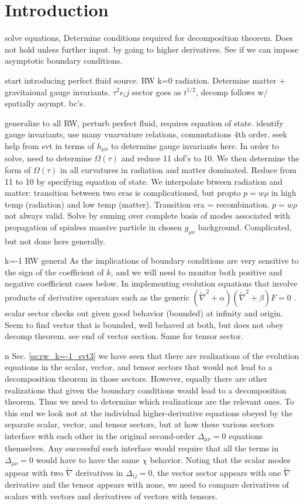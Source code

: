 
\chapter{Introduction}
\label{c:introduction}

solve equations, Determine conditions required for decomposition theorem. Does not hold unless further input. by going to higher derivatives. See if we can impose asymptotic boundary conditions. 

start introducing perfect fluid source. RW k=0 radiation. Determine matter + gravitaional gauge invariants. $\tau^2 e_ij$ sector goes as $t^{1/2}$, decomp follows w/ spatially asympt. bc's.

generalize to all RW, perturb perfect fluid, requires equation of state. identify gauge invariants, use many vuarvature relations, commutations 4th order. seek help from svt in terms of $h_{\mu\nu}$ to determine gauge invariants here. In order to solve, need to determine $\Omega(\tau)$ and reduce 11 dof's to 10. We then determine the form of $\Omega(\tau)$ in all curvatures in radiation and matter dominated. Reduce from 11 to 10 by specifying equation of state. We interpolate btween radiation and matter: transition between two eras is complicationed, but propto $p=w\rho$ in high temp (radiation) and low temp (matter). Transition era = recombination. $p=w\rho$ not always valid. Solve by suming over complete basis of modes associated with propagation of spinless massive particle in chosen $g_{\mu\nu}$ background. Complicated, but not done here generally. 

k=-1 RW general As the implications of boundary conditions are very sensitive to the sign of the coefficient of $k$, and we will need to monitor both positive and negative coefficient cases below. In implementing evolution equations that involve products of derivative operators such as the generic $(\tilde{\nabla}^2+\alpha)(\tilde{\nabla}^2+\beta)F=0$ . scalar sector checks out given good behavior (bounded) at infinity and origin. Seem to find vector that is bounded, well behaved at both, but does not obey decomp theorem. see end of vector section. Same for tensor sector.

n Sec. \ref{ss:rw_k=-1_svt3} we have seen that there are realizations of the evolution equations in the scalar, vector, and tensor sectors that would not lead to a decomposition theorem in those sectors. However, equally there are other realizations that given the boundary conditions would lead to a decomposition theorem. Thus we need to determine which realizations are the relevant ones. To this end we look not at the individual higher-derivative equations obeyed by the separate scalar, vector, and tensor sectors, but at how these various sectors interface with each other in the original second-order $\Delta_{\mu\nu}=0$ equations themselves. Any successful such interface would require that all the terms in $\Delta_{\mu\nu}=0$ would have to have the same $\chi$ behavior. Noting that the scalar modes appear with two $\tilde{\nabla}$ derivatives in $\Delta_{ij}=0$, the vector sector appears with one $\tilde{\nabla}$ derivative and the tensor appears with none, we need to compare derivatives of scalars with vectors and derivatives of vectors with tensors. 

